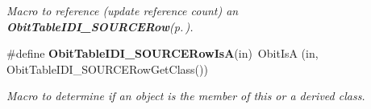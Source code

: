 \begin{CompactItemize}
\begin{CompactList}\small\item\em Macro to reference (update reference count) an {\bf Obit\-Table\-IDI\_\-SOURCERow}{\rm (p.\,\pageref{structObitTableIDI__SOURCERow})}. \item\end{CompactList}\item 
\#define {\bf Obit\-Table\-IDI\_\-SOURCERow\-Is\-A}(in)\ Obit\-Is\-A (in, Obit\-Table\-IDI\_\-SOURCERow\-Get\-Class())
\begin{CompactList}\small\item\em Macro to determine if an object is the member of this or a derived class. \item\end{CompactList}\end{CompactItemize}
